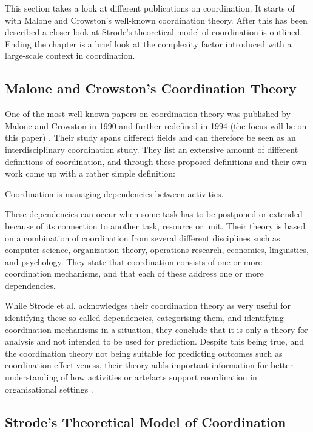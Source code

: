 This section takes a look at different publications on coordination. It starts of with Malone and Crowston's well-known coordination theory. After this has been described a closer look at Strode's theoretical model of coordination is outlined. Ending the chapter is a brief look at the complexity factor introduced with a large-scale context in coordination.

\subsection{Malone and Crowston's Coordination Theory}

One of the most well-known papers on coordination theory was published by Malone and Crowston in 1990 and further redefined in 1994 (the focus will be on this paper) \cite{Malone1994}. Their study spans different fields and can therefore be seen as an interdisciplinary coordination study. They list an extensive amount of different definitions of coordination, and through these proposed definitions and their own work come up with a rather simple definition:

\begin{fancyquotes}
Coordination is managing dependencies between activities.
\end{fancyquotes}

These dependencies can occur when some task has to be postponed or extended because of its connection to another task, resource or unit. Their theory is based on a combination of coordination from several different disciplines such as computer science, organization theory, operations research, economics, linguistics, and psychology. They state that coordination consists of one or more coordination mechanisms, and that each of these address one or more dependencies.

While Strode et al. acknowledges their coordination theory as very useful for identifying these so-called dependencies, categorising them, and identifying coordination mechanisms in a situation, they conclude that it is only a theory for analysis and not intended to be used for prediction. Despite this being true, and the coordination theory not being suitable for predicting outcomes such as coordination effectiveness, their theory adds important information for better understanding of how activities or artefacts support coordination in organisational settings \cite{Strode2012}.

\subsection{Strode's Theoretical Model of Coordination}
\label{strodechap}

